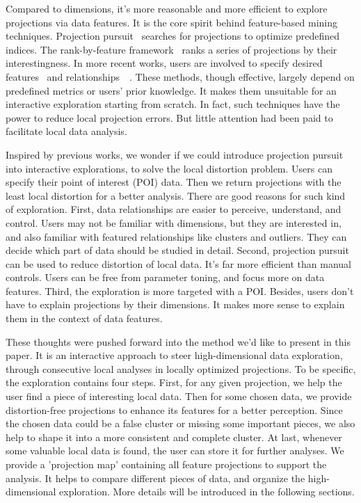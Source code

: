 Compared to dimensions, it's more reasonable and more efficient to explore projections via data features. It is the core spirit behind feature-based mining techniques. Projection pursuit~\cite{DBLP:journals/tc/FriedmanT74} searches for projections to optimize predefined indices. The rank-by-feature framework~\cite{DBLP:journals/ivs/SeoS05} ranks a series of projections by their interestingness. In more recent works, users are involved to specify desired features~\cite{DBLP:journals/tvcg/JohanssonJ09} and relationships~\cite{DBLP:journals/tvcg/HuBMHNL13}~\cite{DBLP:journals/tvcg/Gleicher13}. These methods, though effective, largely depend on predefined metrics or users' prior knowledge. It makes them unsuitable for an interactive exploration starting from scratch. In fact, such techniques have the power to reduce local projection errors. But little attention had been paid to facilitate local data analysis.

Inspired by previous works, we wonder if we could introduce projection pursuit into interactive explorations, to solve the local distortion problem. Users can specify their point of interest (POI) data. Then we return projections with the least local distortion for a better analysis. There are good reasons for such kind of exploration. First, data relationships are easier to perceive, understand, and control. Users may not be familiar with dimensions, but they are interested in, and also familiar with featured relationships like clusters and outliers. They can decide which part of data should be studied in detail. Second, projection pursuit can be used to reduce distortion of local data. It's far more efficient than manual controls. Users can be free from parameter toning, and focus more on data features. Third, the exploration is more targeted with a POI. Besides, users don't have to explain projections by their dimensions. It makes more sense to explain them in the context of data features.

These thoughts were pushed forward into the method we'd like to present in this paper. It is an interactive approach to steer high-dimensional data exploration, through consecutive local analyses in locally optimized projections. To be specific, the exploration contains four steps. First, for any given projection, we help the user find a piece of interesting local data. Then for some chosen data, we provide distortion-free projections to enhance its features for a better perception. Since the chosen data could be a false cluster or missing some important pieces, we also help to shape it into a more consistent and complete cluster. At last, whenever some valuable local data is found, the user can store it for further analyses. We provide a 'projection map' containing all feature projections to support the analysis. It helps to compare different pieces of data, and organize the high-dimensional exploration. More details will be introduced in the following sections.


